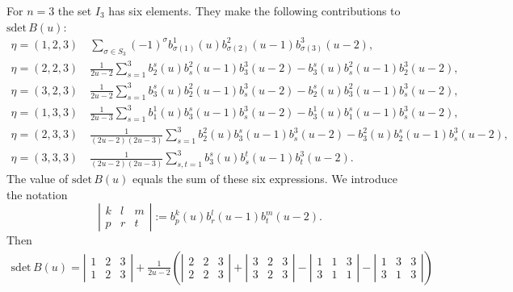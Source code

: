 \documentclass[pdftex]{sigma}
\begin{document}
 \begin{example}
 For $n=3$ the set $I_3$ has six elements.
They make the following contributions to $\text{sdet} \,B(u)$:
\begin{gather*}
\eta=(1,2,3)\quad
 \sum_{\sigma\in S_3}(-1)^{\sigma}b^1_{\sigma(1)}(u)b^2_{\sigma(2)}(u-1)b^{3}_{\sigma(3)}(u-2),\\
\eta=(2,2,3)\quad
 \frac{1}{2u-2}\sum_{s=1}^3b^s_{2}(u)b^2_{s}(u-1)b^{3}_{3}(u-2)-
 b^s_{3}(u)b^2_{s}(u-1)b^{3}_{2}(u-2),\\
\eta=(3,2,3)\quad
\frac{1}{2u-2} \sum_{s=1}^3b^s_{3}(u)b^2_{2}(u-1)b^{3}_{s}(u-2)-
 b^s_{2}(u)b^2_{3}(u-1)b^{3}_{s}(u-2),\\
\eta=(1,3,3)\quad
 \frac{1}{2u-3}
 \sum_{s=1}^3b^1_{1}(u)b^s_{3}(u-1)b^{3}_{s}(u-2)-
 b^1_{3}(u)b^s_{1}(u-1)b^{3}_{s}(u-2),\\
\eta=(2,3,3)\quad
 \frac{1}{(2u-2)(2u-3)}
 \sum_{s=1}^{3}b^2_{2}(u)b^s_{3}(u-1)b^{3}_{s}(u-2)-
 b^2_{3}(u)b^s_{2}(u-1)b^{3}_{s}(u-2),\\
\eta=(3,3,3)\quad
 \frac{1}{(2u-2)(2u-3)}
  \sum_{s,t=1}^{3}b^s_{3}(u)b^t_{s}(u-1)b^{3}_{t}(u-2).
 \end{gather*}
The value  of $\text{sdet} \,B(u)$  equals the sum of these six  expressions.
We introduce the notation
\[
\left\vert\begin{matrix}
k&l&m\\
p&r&t
\end{matrix}\right\vert
:=b^k_{p}(u)b^l_{r}(u-1)b^{m}_{t}(u-2).
\]
Then
\begin{gather*}
\text{sdet} \,B(u)=
\left\vert\begin{matrix}
1&2&3\\
1&2&3
\end{matrix}\right\vert
+\frac{1}{2u-2}\left(
\left\vert\begin{matrix}
2&2&3\\
2&2&3
\end{matrix}\right\vert
+\left\vert\begin{matrix}
3&2&3\\
3&2&3
\end{matrix}\right\vert
-\left\vert\begin{matrix}
1&1&3\\
3&1&1
\end{matrix}\right\vert
-\left\vert\begin{matrix}
1&3&3\\
3&1&3
\end{matrix}\right\vert
\right)\\

\end{gather*}
\end{example}
\end{document}
